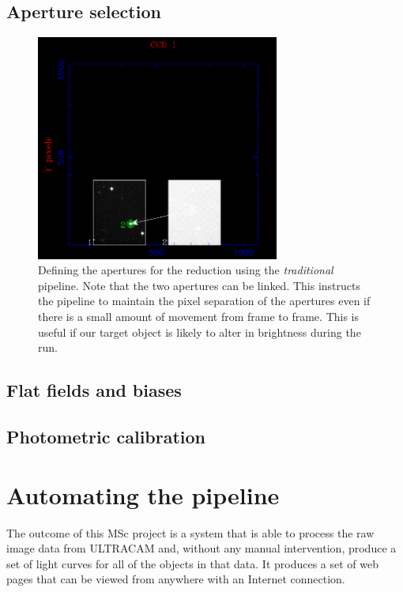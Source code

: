 \subsection{Aperture selection}

\begin{figure}[!h]
\centering
\includegraphics[width=80mm]{images/setaper.png}
\caption{Defining the apertures for the reduction using the \emph{traditional} pipeline. Note that the two apertures can be linked. This instructs the pipeline to maintain the pixel separation of the apertures even if there is a small amount of movement from frame to frame. This is useful if our target object is likely to alter in brightness during the run. }
\label{fig:nnsercomparisontom}
\end{figure}


\subsection{Flat fields and biases}

\subsection{Photometric calibration}

\section{Automating the pipeline}

The outcome of this MSc project is a system that is able to process the raw image data from ULTRACAM and, without any manual intervention, produce a set of light curves for all of the objects in that data. It produces a set of web pages that can be viewed from anywhere with an Internet connection. 

